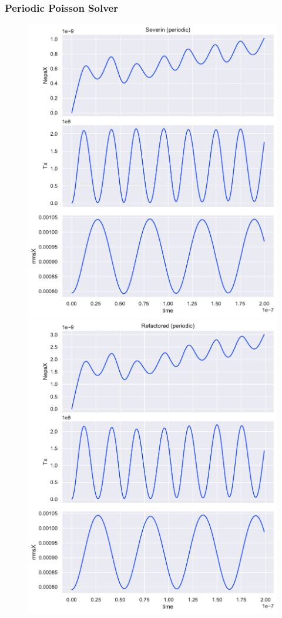 \documentclass[.08pt,aspectratio=169]{beamer}
\begin{document}
\begin{frame}
    \frametitle{Periodic Poisson Solver}

\begin{figure}[!htb]
  \includegraphics[width=1.1\linewidth]{figures/severin_vanilla_periodic.pdf}
  \label{fig:awesome_image2}
\endminipage\hfill
{}%
  \includegraphics[width=1.1\linewidth]{figures/refactored_periodic.pdf}

\end{figure}
\end{frame}
\end{document}
